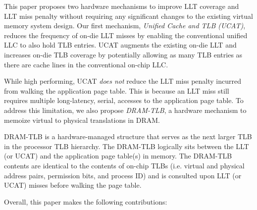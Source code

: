 This paper proposes two hardware mechanisms to improve LLT coverage
and LLT miss penalty without requiring any significant changes to the
existing virtual memory system design. Our first mechanism, {\em
Unified Cache and TLB (UCAT)}, reduces the frequency of on-die LLT
misses by enabling the conventional unified LLC to also hold TLB
entries. UCAT augments the existing on-die LLT and increases on-die
TLB coverage by potentially allowing as many TLB entries as there are
cache lines in the conventional on-chip LLC.


While high performing, UCAT {\em does not} reduce the LLT miss penalty
incurred from walking the application page table. This is because an
LLT miss still requires multiple long-latency, serial, accesses to the
application page table. To address this limitation, we also propose
{\em DRAM-TLB}, a hardware mechanism to memoize virtual to physical
translations in DRAM.

DRAM-TLB is a hardware-managed structure that serves as the next
larger TLB in the processor TLB hierarchy. The DRAM-TLB logically sits
between the LLT (or UCAT) and the application page table(s) in memory. The
DRAM-TLB contents are identical to the contents of on-chip TLBs (i.e.
virtual and physical address pairs, permission bits, and process ID)
and is consulted upon LLT (or UCAT) misses before walking the page table.


Overall, this paper makes the following contributions:

